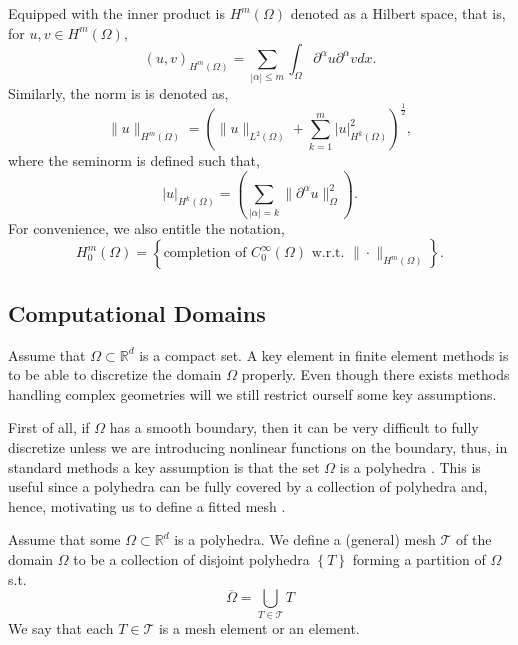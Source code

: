 Equipped with the inner product is $H^{m}\left( \Omega  \right) $  denoted as a Hilbert space, that is, for $u,v \in H^{m}\left( \Omega  \right) $, \[
    \left( u,v \right) _{H^{m}\left( \Omega   \right) } = \sum_{\left\lvert \alpha  \right\rvert  \le  m}^{}  \int_{\Omega }^{} \partial ^{\alpha } u \partial ^{\alpha } v dx.
\]
Similarly, the norm is is denoted as, \[
\| u \|_{ H^{m}\left( \Omega  \right)  }^{  }  = \left( \| u \|_{ L^{2}\left( \Omega  \right)    } + \sum_{k = 1}^{m}  \left\lvert u \right\rvert ^{2} _{  H^{k}\left( \Omega  \right) }\right) ^{\frac{1}{2}},
\]
where the seminorm is defined such that, \[
\left\lvert u \right\rvert _{H^{k}\left( \Omega  \right) } = \left( \sum_{\left\lvert \alpha  \right\rvert  = k}^{} \| \partial ^{\alpha }u \|_{ \Omega  }^{ 2 }  \right).
\]
For convenience, we also entitle the notation,
\[
H^{m}_{0} \left( \Omega  \right) = \left\{ \text{completion of }C_{0}^{\infty}\left( \Omega  \right) \text{ w.r.t. } \| \cdot  \|_{H^{m}\left( \Omega  \right)   }^{  }  \right\}.
\]




\subsection{Computational Domains}%
\label{sub:computational_domain}
Assume that $\Omega \subset \mathbb{R} ^{d} $ is a compact set.
A key element in finite element methods is to be able to discretize the domain $\Omega $ properly. Even though there exists methods handling complex geometries will we still restrict ourself some key assumptions.

First of all, if $\Omega $ has a smooth boundary, then it can be very difficult to fully discretize unless we are introducing nonlinear functions on the boundary, thus, in standard methods a key assumption is that the set $\Omega $ is a polyhedra \cite[Assumption
1.7]{pietro2012}. This is useful since a polyhedra can be fully covered by a collection of polyhedra and, hence, motivating us to define a fitted mesh .

\begin{definition}[Mesh]
   Assume that some $\Omega \subset \mathbb{R} ^{d} $ is a polyhedra.
    We define a (general) mesh $\mathcal{T} $ of the domain $\Omega $ to be a collection of disjoint polyhedra $\left\{ T \right\}  $ forming a partition of $\Omega $ s.t.\[
    \overline{\Omega } = \bigcup _{T \in \mathcal{T} } T
    \]
    We say that each $T \in  \mathcal{T} $ is a mesh element or an element.
\end{definition}

